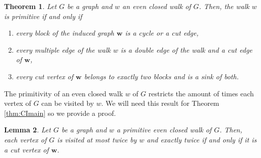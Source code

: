 \documentclass[a4paper, 12pt]{article}
\theoremstyle{plain}
\newtheorem{theorem}{Theorem}[section]
\newtheorem{lemma}[theorem]{Lemma}
\theoremstyle{definition}
\theoremstyle{remark}
\begin{document}
\begin{theorem} \cite[Theorem 3.1]{Reyes2012minimal} \label{thm:reyesprimitive}
    Let $G$ be a graph and $w$ an even closed walk of $G$. Then, the walk $w$ is primitive if and only if
    \begin{enumerate}
        \item\label{item:prim1} every block of the induced graph $\mathbf{w}$ is a cycle or a cut edge,
        \item\label{item:prim2} every multiple edge of the walk $w$ is a double edge of the walk and a cut edge of $\mathbf{w}$,
        \item\label{item:prim3} every cut vertex of $\mathbf{w}$ belongs to exactly two blocks and is a sink of both.
    \end{enumerate}
\end{theorem}

The primitivity of an even closed walk $w$ of $G$ restricts the amount of times each vertex of $G$ can be visited by $w$. We will need this result for Theorem \ref{thm:CImain} so we provide a proof.

\begin{lemma} \label{lem:vertex<3}
    Let $G$ be a graph and $w$ a primitive even closed walk of $G$. Then, each vertex of $G$ is visited at most twice by $w$ and exactly twice if and only if it is a cut vertex of $\mathbf{w}$.
\end{lemma}
\end{document}
